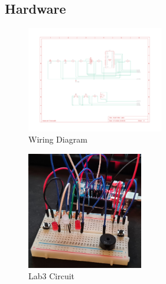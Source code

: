 \documentclass[journal]{IEEEtran}
\begin{document}
\subsection{Hardware}

\begin{figure}[H]%
    \begin {center}
    \includegraphics[width=0.53\textwidth, trim={0 2cm 0 2cm}]{images/wiring-diagram.pdf}
    \caption{Wiring Diagram}
    \label{fig:wiring}
    \end {center}
\end{figure}

\vfill\null
\pagebreak

\begin{figure}[H]
    \begin {center}
    \includegraphics[width=0.45\textwidth]{images/circuit-picture.jpg}
    \caption{Lab3 Circuit}
    \label{fig:circuitPicture}
    \end {center}
\end{figure}
\end{document}
